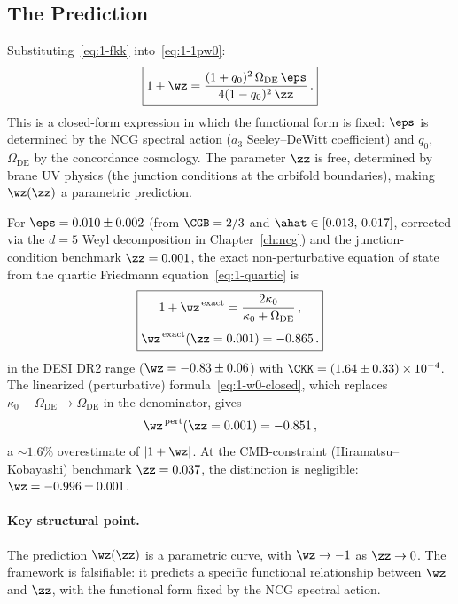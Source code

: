 \subsection{The Prediction}
\label{sec:1-prediction-w0}

Substituting~\eqref{eq:1-fkk} into~\eqref{eq:1-1pw0}:
\begin{equation}
\label{eq:1-w0-closed}
\boxed{1 + \wz = \frac{(1+q_0)^2\,\Omega_{\mathrm{DE}}\,\eps}{4(1 - q_0)^2\,\zz}\,.}
\end{equation}
This is a closed-form expression in which the functional form is fixed: $\eps$ is determined by the NCG spectral action ($a_3$ Seeley--DeWitt coefficient) and $q_0$, $\Omega_{\mathrm{DE}}$ by the concordance cosmology. The parameter $\zz$ is free, determined by brane UV physics (the junction conditions at the orbifold boundaries), making $\wz(\zz)$ a parametric prediction.

For $\eps = 0.010 \pm 0.002$ (from $\CGB = 2/3$ and $\ahat \in [0.013,\, 0.017]$, corrected via the $d = 5$ Weyl decomposition in Chapter~\ref{ch:ncg}) and the junction-condition benchmark $\zz = 0.001$, the exact non-perturbative equation of state from the quartic Friedmann equation~\eqref{eq:1-quartic} is
\begin{equation}
\label{eq:1-w0-nonpert}
\boxed{\begin{gathered}
1 + \wz^{\,\mathrm{exact}} = \frac{2\kappa_0}{\kappa_0 + \Omega_{\mathrm{DE}}}\,,\\[4pt]
\wz^{\,\mathrm{exact}}(\zz = 0.001) = -0.865\,.
\end{gathered}}
\end{equation}
in the DESI DR2 range ($\wz = -0.83 \pm 0.06$) with $\CKK = (1.64 \pm 0.33) \times 10^{-4}$. The linearized (perturbative) formula~\eqref{eq:1-w0-closed}, which replaces $\kappa_0 + \Omega_{\mathrm{DE}} \to \Omega_{\mathrm{DE}}$ in the denominator, gives
\begin{equation}
\label{eq:1-w0-value}
\wz^{\,\mathrm{pert}}(\zz = 0.001) = -0.851\,,
\end{equation}
a ${\sim}1.6\%$ overestimate of $|1 + \wz|$. At the CMB-constraint (Hiramatsu--Kobayashi) benchmark $\zz = 0.037$, the distinction is negligible: $\wz = -0.996 \pm 0.001$.

\paragraph{Key structural point.} The prediction $\wz(\zz)$ is a parametric curve, with $\wz \to -1$ as $\zz \to 0$. The framework is falsifiable: it predicts a specific functional relationship between $\wz$ and $\zz$, with the functional form fixed by the NCG spectral action.

